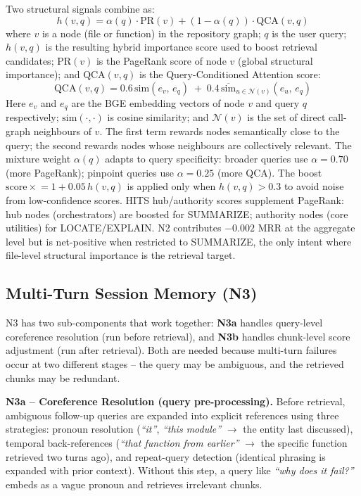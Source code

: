 \documentclass[conference]{IEEEtran}
\begin{document}
Two structural signals combine as:
\begin{equation}
h(v,q) = \alpha(q)\cdot\text{PR}(v) + (1{-}\alpha(q))\cdot\text{QCA}(v,q)
\end{equation}
where $v$ is a node (file or function) in the repository graph; $q$ is
the user query; $h(v,q)$ is the resulting hybrid importance score used
to boost retrieval candidates; $\text{PR}(v)$ is the PageRank score of
node $v$ (global structural importance); and $\text{QCA}(v,q)$ is the
Query-Conditioned Attention score:
\begin{equation*}
\text{QCA}(v,q) = 0.6\,\text{sim}(e_v,\, e_q)\;+\;0.4\,\overline{\text{sim}}_{u\in\mathcal{N}(v)}(e_u,\, e_q)
\end{equation*}
Here $e_v$ and $e_q$ are the BGE embedding vectors of node $v$ and
query $q$ respectively; $\text{sim}(\cdot,\cdot)$ is cosine similarity;
and $\mathcal{N}(v)$ is the set of direct call-graph neighbours of $v$.
The first term rewards nodes semantically close to the query; the second
rewards nodes whose neighbours are collectively relevant.
The mixture weight $\alpha(q)$ adapts to query specificity: broader queries
use $\alpha{=}0.70$ (more PageRank); pinpoint queries use $\alpha{=}0.25$
(more QCA). The boost $\text{score}\mathrel{\times}=1+0.05\,h(v,q)$ is
applied only when $h(v,q) > 0.3$ to avoid noise from low-confidence scores.
HITS hub/authority scores supplement PageRank: hub nodes (orchestrators)
are boosted for SUMMARIZE; authority nodes (core utilities) for LOCATE/EXPLAIN.
N2 contributes $-0.002$ MRR at the aggregate level but is net-positive when
restricted to SUMMARIZE, the only intent where file-level structural importance
is the retrieval target.

\subsection{Multi-Turn Session Memory (N3)}

N3 has two sub-components that work together: \textbf{N3a} handles
query-level coreference resolution (run before retrieval), and \textbf{N3b}
handles chunk-level score adjustment (run after retrieval). Both are
needed because multi-turn failures occur at two different stages --
the query may be ambiguous, and the retrieved chunks may be redundant.

\textbf{N3a -- Coreference Resolution (query pre-processing).}
Before retrieval, ambiguous follow-up queries are expanded into explicit
references using three strategies: pronoun resolution
(\textit{``it''}, \textit{``this module''} $\to$ the entity last discussed),
temporal back-references (\textit{``that function from earlier''} $\to$
the specific function retrieved two turns ago), and repeat-query detection
(identical phrasing is expanded with prior context). Without this step,
a query like \textit{``why does it fail?''} embeds as a vague pronoun and
retrieves irrelevant chunks.
\end{document}
